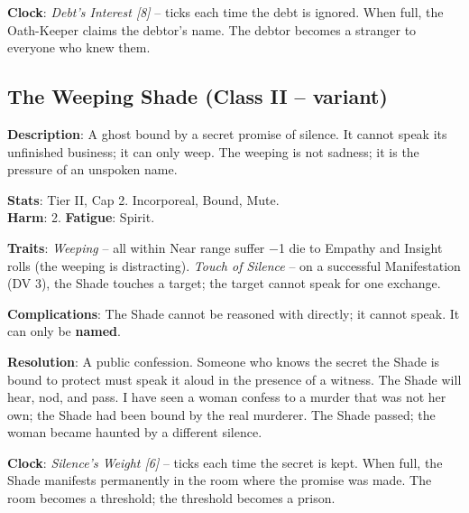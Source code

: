 \noindent\textbf{Clock}: \emph{Debt's Interest [8]} -- ticks each time the debt is ignored. When full, the Oath-Keeper claims the debtor's name. The debtor becomes a stranger to everyone who knew them.


\subsection*{The Weeping Shade (Class II -- variant)}

\noindent\textbf{Description}: A ghost bound by a secret promise of silence. It cannot speak its unfinished business; it can only weep. The weeping is not sadness; it is the pressure of an unspoken name.

\noindent\textbf{Stats}: Tier II, Cap 2. Incorporeal, Bound, Mute.\\
\textbf{Harm}: 2. \textbf{Fatigue}: Spirit.

\noindent\textbf{Traits}: 
\emph{Weeping} -- all within Near range suffer −1 die to Empathy and Insight rolls (the weeping is distracting). \emph{Touch of Silence} -- on a successful Manifestation (DV 3), the Shade touches a target; the target cannot speak for one exchange.

\noindent\textbf{Complications}: The Shade cannot be reasoned with directly; it cannot speak. It can only be \textbf{named}.

\noindent\textbf{Resolution}: A public confession. Someone who knows the secret the Shade is bound to protect must speak it aloud in the presence of a witness. The Shade will hear, nod, and pass. I have seen a woman confess to a murder that was not her own; the Shade had been bound by the real murderer. The Shade passed; the woman became haunted by a different silence.

\noindent\textbf{Clock}: \emph{Silence's Weight [6]} -- ticks each time the secret is kept. When full, the Shade manifests permanently in the room where the promise was made. The room becomes a threshold; the threshold becomes a prison.


